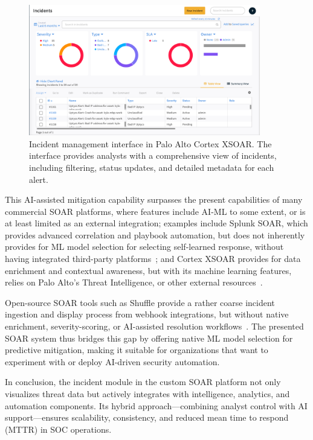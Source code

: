 \begin{figure}[ht]
    \centering
    \includegraphics[width=0.9\textwidth]{images/xsoar_incidents.png}
    \caption[Incident management interface in Palo Alto Cortex XSOAR]{Incident management interface in Palo Alto Cortex XSOAR. The interface provides analysts with a comprehensive view of incidents, including filtering, status updates, and detailed metadata for each alert.}
    \label{fig:xsoar-incidents}
\end{figure}

This AI-assisted mitigation capability surpasses the present capabilities of many commercial SOAR platforms, where features include AI-ML to some extent, or is at least limited as an external integration; examples include Splunk SOAR, which provides advanced correlation and playbook automation, but does not inherently provides for ML model selection for selecting self-learned response, without having integrated third-party platforms~\cite{splunk}; and Cortex XSOAR provides for data enrichment and contextual awareness, but with its machine learning features, relies on Palo Alto’s Threat Intelligence, or other external resources~\cite{paloalto}.

Open-source SOAR tools such as Shuffle provide a rather coarse incident ingestion and display process from webhook integrations, but without native enrichment, severity-scoring, or AI-assisted resolution workflows~\cite{techtarget}. The presented SOAR system thus bridges this gap by offering native ML model selection for predictive mitigation, making it suitable for organizations that want to experiment with or deploy AI-driven security automation.

In conclusion, the incident module in the custom SOAR platform not only visualizes threat data but actively integrates with intelligence, analytics, and automation components. Its hybrid approach—combining analyst control with AI support—ensures scalability, consistency, and reduced mean time to respond (MTTR) in SOC operations.

